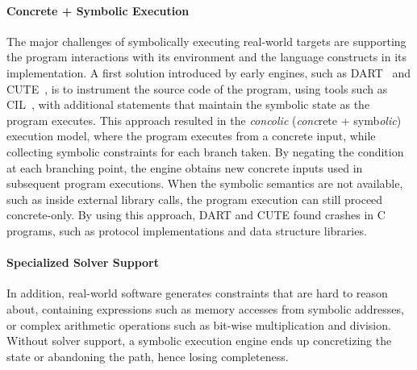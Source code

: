 \paragraph{Concrete + Symbolic Execution}

The major challenges of symbolically executing real-world targets are supporting the program interactions with its environment and the language constructs in its implementation.
%
A first solution introduced by early engines, such as DART~\cite{dart} and CUTE~\cite{cute}, is to instrument the source code of the program, using tools such as CIL~\cite{cil}, with additional statements that maintain the symbolic state as the program executes.  This approach resulted in the \emph{concolic} (\emph{conc}rete + symb\emph{olic}) execution model, where the program executes from a concrete input, while collecting symbolic constraints for each branch taken.  By negating the condition at each branching point, the engine obtains new concrete inputs used in subsequent program executions.
%
When the symbolic semantics are not available, such as inside external library calls, the program execution can still proceed concrete-only.
%
By using this approach, DART and CUTE found crashes in C programs, such as protocol implementations and data structure libraries.


\paragraph{Specialized Solver Support}

In addition, real-world software generates constraints that are hard to reason about, containing expressions such as memory accesses from symbolic addresses, or complex arithmetic operations such as bit-wise multiplication and division.  Without solver support, a symbolic execution engine ends up concretizing the state or abandoning the path, hence losing completeness.

